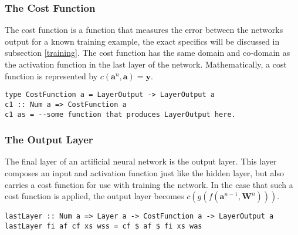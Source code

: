 \documentclass[a4paper]{article}
\begin{document}
\subsubsection{The Cost Function}
The cost function is a function that measures the error between the networks
output for a known training example, the exact specifics will be discussed in
subsection \ref{training}. The cost function has the same domain and co-domain
as the activation function in the last layer of the network. Mathematically, a
cost function is represented by 
$c(\boldsymbol{a}^n, \boldsymbol{a}) = \boldsymbol{y}$.
\begin{verbatim}
type CostFunction a = LayerOutput -> LayerOutput a
c1 :: Num a => CostFunction a
c1 as = --some function that produces LayerOutput here.
\end{verbatim}
   

\subsubsection{The Output Layer}
The final layer of an artificial neural network is the output layer. This layer
composes an input and activation function just like the hidden layer, but also
carries a cost function for use with training the network. In the case that
such a cost function is applied, the output layer becomes $
c(g(f(\boldsymbol{a}^{n - 1}, \boldsymbol{W}^{n})))$.
\begin{verbatim}
lastLayer :: Num a => Layer a -> CostFunction a -> LayerOutput a
lastLayer fi af cf xs wss = cf $ af $ fi xs was
\end{verbatim}
\end{document}
